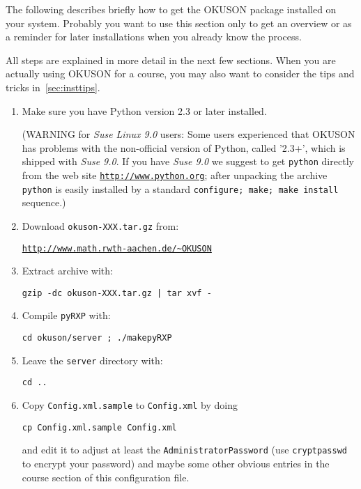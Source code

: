 \documentclass[12pt,openany,a4paper]{book}
\newcommand{\OKUSON}{\textsf{OKUSON}}
\begin{document}
The following describes briefly how to get the {\OKUSON} package installed on
your system.
Probably you want to use this section only to get an overview or as
a reminder for later installations when you already know the process.

All steps are explained in more detail in the next few sections. When you are
actually using {\OKUSON} for a course, you may also want to consider the tips
and tricks in~\ref{sec:insttips}.

\begin{enumerate}
\setlength{\parskip}{0mm}
\item Make sure you have Python version 2.3 or later installed.

(WARNING for \emph{Suse Linux 9.0} users: 
Some users experienced that {\OKUSON} has problems with the non-official 
version of Python, called '2.3+', which is shipped with \emph{Suse 9.0}.
If you have \emph{Suse  9.0} we suggest to get \texttt{python} directly from
the web site \href{http://www.python.org}{\texttt{http://www.python.org}}; 
after unpacking the archive \texttt{python} is easily installed by 
a standard \texttt{configure;
make; make install} sequence.)
\item Download \texttt{okuson-XXX.tar.gz} from:

\hspace*{5mm}\href{http://www.math.rwth-aachen.de/~OKUSON}%
{\texttt{http://www.math.rwth-aachen.de/\~{}OKUSON}}

\item Extract archive with: 

\hspace*{5mm}\texttt{gzip -dc okuson-XXX.tar.gz | tar xvf -}
\item Compile \texttt{pyRXP} with: 

\hspace*{5mm}\texttt{cd okuson/server ; ./makepyRXP}
\item Leave the \texttt{server} directory with: 

\hspace*{5mm}\texttt{cd ..}
\item Copy \texttt{Config.xml.sample} to \texttt{Config.xml} by doing

\hspace*{5mm}\texttt{cp Config.xml.sample Config.xml}

and edit it to adjust at least the \texttt{AdministratorPassword}
(use \texttt{cryptpasswd} to encrypt your password) and maybe some 
other obvious entries in the course section of this configuration file.


\end{enumerate}
\end{document}
